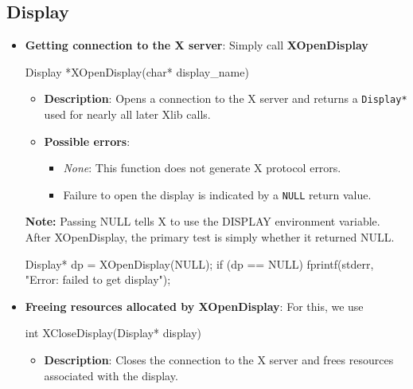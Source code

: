 \documentclass{report}
\begin{document}
\begin{itemize}
    \end{itemize}

    \pagebreak 
    \subsection{Display}
    \begin{itemize}
        \item \textbf{Getting connection to the X server}: Simply call \textbf{XOpenDisplay}
            \bigbreak \noindent 
            \begin{cppcode}
                Display *XOpenDisplay(char* display_name)
            \end{cppcode}
            \begin{itemize}
                \item \textbf{Description}: Opens a connection to the X server and returns a \texttt{Display*} used for nearly all later Xlib calls.
                \item \textbf{Possible errors}:
                    \begin{itemize}
                        \item \textit{None}: This function does not generate X protocol errors.
                        \item Failure to open the display is indicated by a \texttt{NULL} return value.
                    \end{itemize}
            \end{itemize}
            \textbf{Note:} Passing NULL tells X to use the DISPLAY environment variable.
            \bigbreak \noindent 
            After XOpenDisplay, the primary test is simply whether it returned NULL.
            \bigbreak \noindent 
            \begin{cppcode}
            Display* dp = XOpenDisplay(NULL);
            if (dp == NULL) {
                fprintf(stderr, "Error: failed to get display");
            }
            \end{cppcode}
        \item \textbf{Freeing resources allocated by XOpenDisplay}: For this, we use
            \bigbreak \noindent 
            \begin{cppcode}
                int XCloseDisplay(Display* display)
            \end{cppcode}
            \begin{itemize}
                \item \textbf{Description}: Closes the connection to the X server and frees resources associated with the display.

\end{itemize}
\end{itemize}
\end{document}
